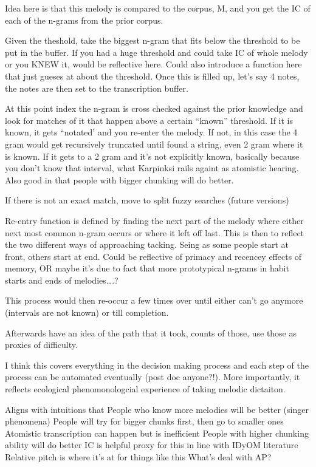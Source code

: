 \documentclass[]{book}
\theoremstyle{definition}
\theoremstyle{definition}
\theoremstyle{definition}
\theoremstyle{remark}
\begin{document}
Idea here is that this melody is compared to the corpus, M, and you get
the IC of each of the n-grams from the prior corpus.

Given the theshold, take the biggest n-gram that fits below the
threshold to be put in the buffer. If you had a huge threshold and could
take IC of whole melody or you KNEW it, would be reflective here. Could
also introduce a function here that just gueses at about the threshold.
Once this is filled up, let's say 4 notes, the notes are then set to the
transcription buffer.

At this point index the n-gram is cross checked against the prior
knowledge and look for matches of it that happen above a certain
``known'' threshold. If it is known, it gets ``notated' and you re-enter
the melody. If not, in this case the 4 gram would get recursively
truncated until found a string, even 2 gram where it is known. If it
gets to a 2 gram and it's not explicitly known, basically because you
don't know that interval, what Karpinksi rails againt as atomistic
hearing. Also good in that people with bigger chunking will do better.

If there is not an exact match, move to split fuzzy searches (future
versions)

Re-entry function is defined by finding the next part of the melody
where either next most common n-gram occurs or where it left off last.
This is then to reflect the two different ways of approaching tacking.
Seing as some people start at front, others start at end. Could be
reflective of primacy and recencey effects of memory, OR maybe it's due
to fact that more prototypical n-grams in habit starts and ends of
melodies\ldots{}.?

This process would then re-occur a few times over until either can't go
anymore (intervals are not known) or till completion.

Afterwards have an idea of the path that it took, counts of those, use
those as proxies of difficulty.

I think this covers everything in the decision making process and each
step of the process can be automated eventually (post doc anyone?!).
More importantly, it reflects ecological phenomonologcial experience of
taking melodic dictaiton.

Aligns with intuitions that People who know more melodies will be better
(singer phenomena) People will try for bigger chunks first, then go to
smaller ones Atomistic transcription can happen but is inefficient
People with higher chunking ability will do better IC is helpful proxy
for this in line with IDyOM literature Relative pitch is where it's at
for things like this What's deal with AP?
\end{document}
